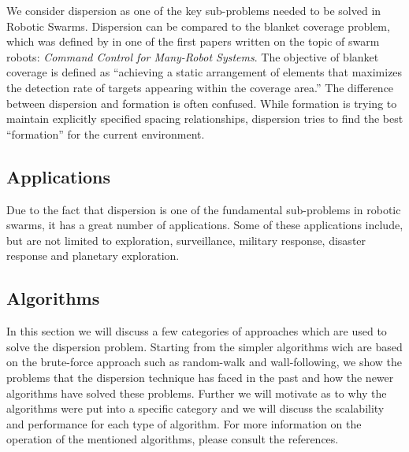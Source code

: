 We consider dispersion as one of the key sub-problems needed to be solved in Robotic Swarms.\cite{ugur2007dispersion,mclurkin2007distributed,ludwig2006robotic} Dispersion can be compared to the blanket coverage problem, which was defined by in one of the first papers written on the topic of swarm robots: \emph{Command Control for Many-Robot Systems}.\cite{gage1992command} The objective of blanket coverage is defined as ``achieving a static arrangement of elements that maximizes the detection rate of targets appearing within the coverage area.''\cite{gage1992command} The difference between dispersion and formation is often confused. While formation is trying to maintain explicitly specified spacing relationships, dispersion tries to find the best ``formation'' for the current environment. 

\subsection{Applications}
Due to the fact that dispersion is one of the fundamental sub-problems in robotic swarms, it has a great number of applications.
Some of these applications include, but are not limited to exploration, surveillance, military response, disaster response and planetary exploration.\cite{ludwig2006robotic,Penders2011,mclurkin2007distributed} 

\subsection{Algorithms}
In this section we will discuss a few categories of approaches which are used to solve the dispersion problem.
Starting from the simpler algorithms wich are based on the brute-force approach such as random-walk and wall-following, we show the problems that the dispersion technique has faced in the past and how the newer algorithms have solved these problems.
Further we will motivate as to why the algorithms were put into a specific category and we will discuss the scalability and performance for each type of algorithm.
For more information on the operation of the mentioned algorithms, please consult the references.

